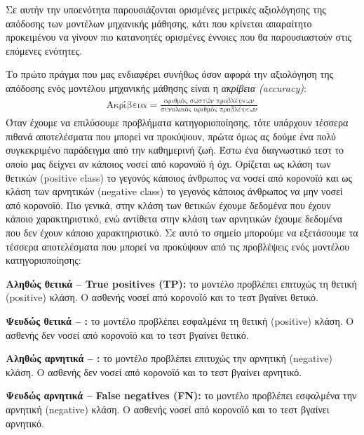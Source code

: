 \noindent Σε αυτήν την υποενότητα παρουσιάζονται ορισμένες μετρικές αξιολόγησης της απόδοσης των μοντέλων μηχανικής μάθησης, κάτι που κρίνεται απαραίτητο προκειμένου να γίνουν πιο κατανοητές ορισμένες έννοιες που θα παρουσιαστούν στις επόμενες ενότητες.

\noindent Το πρώτο πράγμα που μας ενδιαφέρει συνήθως όσον αφορά την αξιολόγηση της απόδοσης ενός μοντέλου μηχανικής μάθησης είναι η \textit{ακρίβεια (accuracy)}:
\begin{align*}
 \text{Ακρίβεια} = \frac{\text{αριθμός σωστών προβλέψεων}}{\text{συνολικός αριθμός προβλέψεων}}
\end{align*}
Όταν έχουμε να επιλύσουμε προβλήματα κατηγοριοποίησης, τότε υπάρχουν τέσσερα πιθανά αποτελέσματα που μπορεί να προκύψουν, πρώτα όμως ας δούμε ένα πολύ συγκεκριμένο παράδειγμα από την καθημερινή ζωή. Έστω ένα διαγνωστικό τεστ το οποίο μας δείχνει αν κάποιος νοσεί από κορονοϊό ή όχι. Ορίζεται ως κλάση των θετικών (positive class) το γεγονός κάποιος άνθρωπος να νοσεί από κορονοϊό και ως κλάση των αρνητικών (negative class) το γεγονός κάποιος άνθρωπος να μην νοσεί από κορονοϊό. Πιο γενικά, στην κλάση των θετικών έχουμε δεδομένα που έχουν κάποιο χαρακτηριστικό, ενώ αντίθετα στην κλάση των αρνητικών έχουμε δεδομένα που δεν έχουν κάποιο χαρακτηριστικό. Σε αυτό το σημείο μπορούμε να εξετάσουμε τα τέσσερα αποτελέσματα που μπορεί να προκύψουν από τις προβλέψεις ενός μοντέλου κατηγοριοποίησης:

\bigskip

\noindent \textbf{Αληθώς θετικά – True positives (TP):} το μοντέλο προβλέπει επιτυχώς τη θετική (positive) κλάση. Ο ασθενής νοσεί από κορονοϊό και το τεστ βγαίνει θετικό.

\bigskip

\noindent \textbf{Ψευδώς θετικά – :} το μοντέλο προβλέπει εσφαλμένα τη θετική (positive) κλάση. Ο ασθενής δεν νοσεί από κορονοϊό και το τεστ βγαίνει θετικό.

\bigskip

\noindent \textbf{Αληθώς αρνητικά – :} το μοντέλο προβλέπει επιτυχώς την αρνητική (negative) κλάση. Ο ασθενής δεν νοσεί από κορονοϊό και το τεστ βγαίνει αρνητικό.

\bigskip

\noindent \textbf{Ψευδώς αρνητικά – False negatives (FN):} το μοντέλο προβλέπει εσφαλμένα την αρνητική (negative) κλάση. Ο ασθενής νοσεί από κορονοϊό και το τεστ βγαίνει αρνητικό.

\bigskip

